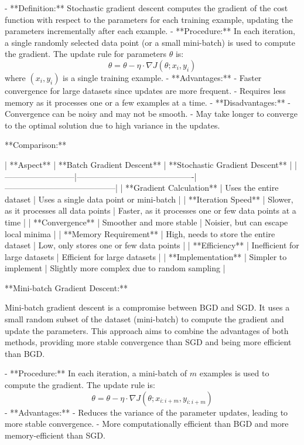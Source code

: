 - **Definition:** Stochastic gradient descent computes the gradient of the cost function with respect to the parameters for each training example, updating the parameters incrementally after each example.
- **Procedure:** In each iteration, a single randomly selected data point (or a small mini-batch) is used to compute the gradient. The update rule for parameters \( \theta \) is:
  \[ \theta = \theta - \eta \cdot \nabla J(\theta; x_i, y_i) \]
  where \( (x_i, y_i) \) is a single training example.
- **Advantages:**
  - Faster convergence for large datasets since updates are more frequent.
  - Requires less memory as it processes one or a few examples at a time.
- **Disadvantages:**
  - Convergence can be noisy and may not be smooth.
  - May take longer to converge to the optimal solution due to high variance in the updates.

**Comparison:**

| **Aspect**               | **Batch Gradient Descent**                | **Stochastic Gradient Descent**         |
|--------------------------|-------------------------------------------|-----------------------------------------|
| **Gradient Calculation** | Uses the entire dataset                   | Uses a single data point or mini-batch  |
| **Iteration Speed**      | Slower, as it processes all data points   | Faster, as it processes one or few data points at a time |
| **Convergence**          | Smoother and more stable                  | Noisier, but can escape local minima    |
| **Memory Requirement**   | High, needs to store the entire dataset   | Low, only stores one or few data points |
| **Efficiency**           | Inefficient for large datasets            | Efficient for large datasets            |
| **Implementation**       | Simpler to implement                      | Slightly more complex due to random sampling |

**Mini-batch Gradient Descent:**

Mini-batch gradient descent is a compromise between BGD and SGD. It uses a small random subset of the dataset (mini-batch) to compute the gradient and update the parameters. This approach aims to combine the advantages of both methods, providing more stable convergence than SGD and being more efficient than BGD.

- **Procedure:** In each iteration, a mini-batch of \( m \) examples is used to compute the gradient. The update rule is:
  \[ \theta = \theta - \eta \cdot \nabla J(\theta; x_{i:i+m}, y_{i:i+m}) \]
- **Advantages:**
  - Reduces the variance of the parameter updates, leading to more stable convergence.
  - More computationally efficient than BGD and more memory-efficient than SGD.

